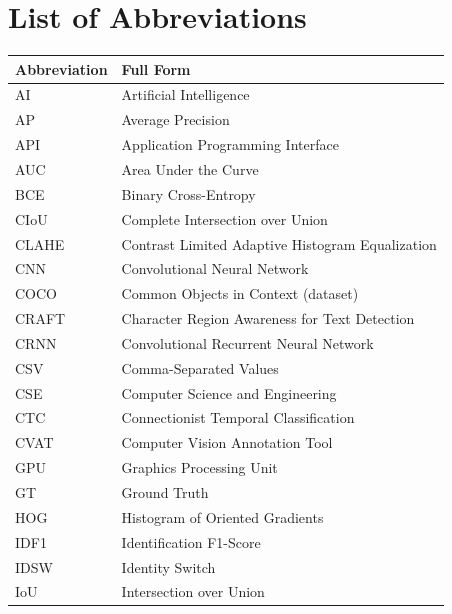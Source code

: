 \chapter*{List of Abbreviations}

\begin{table}[H]
    \centering
    \begin{tabular}{@{}ll@{}}
        \toprule
        \textbf{Abbreviation} & \textbf{Full Form} \\
        \midrule
        AI      & Artificial Intelligence \\
        AP      & Average Precision \\
        API     & Application Programming Interface \\
        AUC     & Area Under the Curve \\
        BCE     & Binary Cross-Entropy \\
        CIoU    & Complete Intersection over Union \\
        CLAHE   & Contrast Limited Adaptive Histogram Equalization \\
        CNN     & Convolutional Neural Network \\
        COCO    & Common Objects in Context (dataset) \\
        CRAFT   & Character Region Awareness for Text Detection \\
        CRNN    & Convolutional Recurrent Neural Network \\
        CSV     & Comma-Separated Values \\
        CSE     & Computer Science and Engineering \\
        CTC     & Connectionist Temporal Classification \\
        CVAT    & Computer Vision Annotation Tool \\
        GPU     & Graphics Processing Unit \\
        GT      & Ground Truth \\
        HOG     & Histogram of Oriented Gradients \\
        IDF1    & Identification F1-Score \\
        IDSW    & Identity Switch \\
        IoU     & Intersection over Union \\

\end{tabular}
\end{table}
